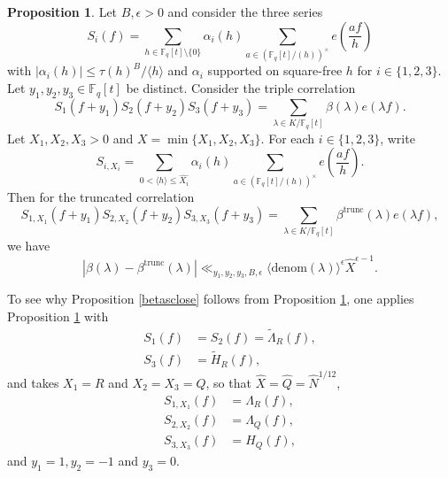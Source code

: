 \documentclass{article}
\theoremstyle{definition}
\newtheorem{prop}{Proposition}[section]
\theoremstyle{definition}
\theoremstyle{remark}
\newcommand{\F}{\mathbb{F}_q[t]}
\newcommand{\1}{\mathbf{1}}
\numberwithin{equation}{section}
\begin{document}
\begin{prop}\label{triplecorrelation}
Let $B,\epsilon>0$ and consider the three series 
\[S_i(f)=\sum_{h\in \F\setminus\{0\}}\alpha_i(h)\sum_{a\in (\F/(h))^\times} e\left(\frac{af}{h}\right)\]
with $|\alpha_i(h)|\leq \tau(h)^B/\langle h \rangle$ and $\alpha_i$ supported on square-free $h$ for $i\in\{1,2,3\}$. Let $y_1,y_2,y_3\in \F$ be distinct. Consider the triple correlation 
\[S_1(f+y_1)S_2(f+y_2)S_3(f+y_3)=\sum_{\lambda\in K/\F}\beta(\lambda)e(\lambda f).\]
Let $X_1,X_2,X_3>0$ and $X=\min\{X_1,X_2,X_3\}$. For each $i\in\{1,2,3\}$, write
\[S_{i,X_i}=\sum_{0<\langle h \rangle \leq \widehat{X_i}}\alpha_i(h)\sum_{a\in (\F/(h))^\times}e\left(\frac{af}{h}\right).\]
Then for the truncated correlation
\[S_{1,X_1}(f+y_1)S_{2,X_2}(f+y_2)S_{3,X_3}(f+y_3)=\sum_{\lambda\in K/\F}\beta^{\text{trunc}}(\lambda)e(\lambda f),\]
we have
\[|\beta(\lambda)-\beta^{\text{trunc}}(\lambda)|\ll_{y_1,y_2,y_3,B,\epsilon} \langle \text{denom}(\lambda)\rangle ^{\epsilon}\widehat{X}^{\epsilon-1}.\]
\end{prop}

\hspace{2cm}

To see why Proposition \ref{betasclose} follows from Proposition \ref{triplecorrelation}, one applies Proposition \ref{triplecorrelation} with 
\begin{align*}
S_1(f)&=S_2(f)=\widetilde{\Lambda}_R(f),\\
S_3(f)&=\widetilde{H}_R(f),
\end{align*}
and takes $X_1=R$ and $X_2=X_3=Q$, so that $\widehat{X}=\widehat{Q}=\widehat{N}^{1\slash 12}$,
\begin{align*}
S_{1,X_1}(f)&=\Lambda_R(f),\\
S_{2,X_2}(f)&=\Lambda_Q(f),\\
S_{3,X_3}(f)&=H_Q(f),
\end{align*}
and $y_1=1, y_2=-1$ and $y_3=0$. 
\end{document}
